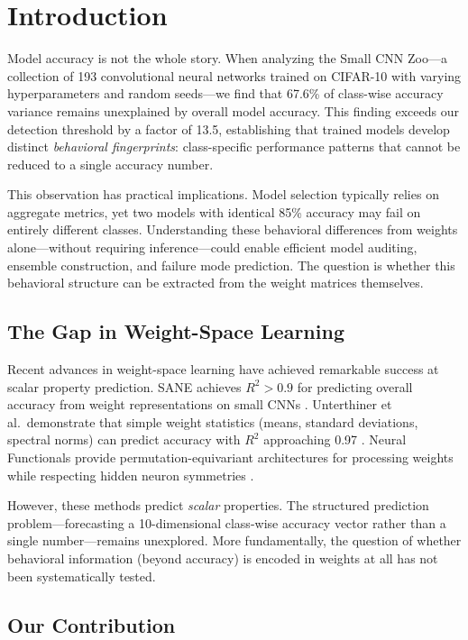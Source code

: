 \section{Introduction}

Model accuracy is not the whole story. When analyzing the Small CNN Zoo---a collection of 193 convolutional neural networks trained on CIFAR-10 with varying hyperparameters and random seeds---we find that 67.6\% of class-wise accuracy variance remains unexplained by overall model accuracy. This finding exceeds our detection threshold by a factor of 13.5, establishing that trained models develop distinct \emph{behavioral fingerprints}: class-specific performance patterns that cannot be reduced to a single accuracy number.

This observation has practical implications. Model selection typically relies on aggregate metrics, yet two models with identical 85\% accuracy may fail on entirely different classes. Understanding these behavioral differences from weights alone---without requiring inference---could enable efficient model auditing, ensemble construction, and failure mode prediction. The question is whether this behavioral structure can be extracted from the weight matrices themselves.

\subsection{The Gap in Weight-Space Learning}

Recent advances in weight-space learning have achieved remarkable success at scalar property prediction. SANE achieves $R^2 > 0.9$ for predicting overall accuracy from weight representations on small CNNs \cite{schurholt2024sane}. Unterthiner et al.\ demonstrate that simple weight statistics (means, standard deviations, spectral norms) can predict accuracy with $R^2$ approaching 0.97 \cite{unterthiner2020predicting}. Neural Functionals provide permutation-equivariant architectures for processing weights while respecting hidden neuron symmetries \cite{zhou2023nf}.

However, these methods predict \emph{scalar} properties. The structured prediction problem---forecasting a 10-dimensional class-wise accuracy vector rather than a single number---remains unexplored. More fundamentally, the question of whether behavioral information (beyond accuracy) is encoded in weights at all has not been systematically tested.

\subsection{Our Contribution}


